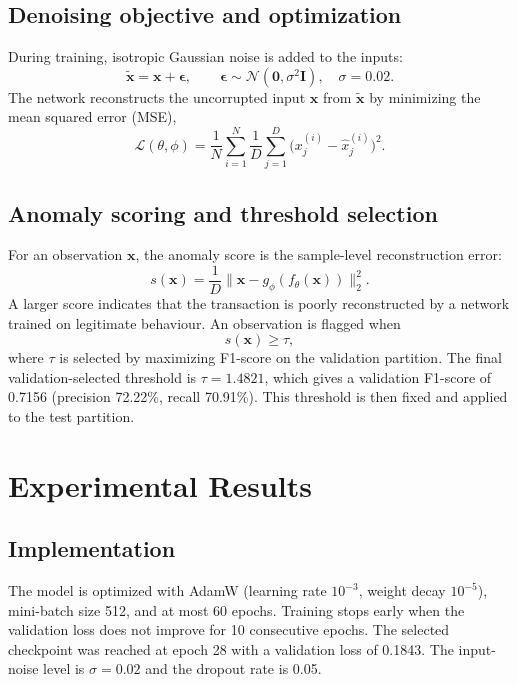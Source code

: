 \documentclass[conference]{IEEEtran}
\begin{document}
\subsection{Denoising objective and optimization}
During training, isotropic Gaussian noise is added to the inputs:
\begin{equation}
\tilde{\mathbf{x}}=\mathbf{x}+\boldsymbol{\epsilon},\qquad \boldsymbol{\epsilon}\sim\mathcal{N}(\mathbf{0},\sigma^{2}\mathbf{I}),\quad \sigma=0.02.
\end{equation}
The network reconstructs the uncorrupted input $\mathbf{x}$ from $\tilde{\mathbf{x}}$ by minimizing the mean squared error (MSE),
\begin{equation}
\mathcal{L}(\theta,\phi)=\frac{1}{N}\sum_{i=1}^{N}\frac{1}{D}\sum_{j=1}^{D}\bigl(x_j^{(i)}-\hat{x}_j^{(i)}\bigr)^{2}.
\label{eq:loss}
\end{equation}

\subsection{Anomaly scoring and threshold selection}
For an observation $\mathbf{x}$, the anomaly score is the sample-level reconstruction error:
\begin{equation}
s(\mathbf{x})=\frac{1}{D}\bigl\lVert\mathbf{x}-g_\phi(f_\theta(\mathbf{x}))\bigr\rVert_2^{2}.
\label{eq:score}
\end{equation}
A larger score indicates that the transaction is poorly reconstructed by a network trained on legitimate behaviour. An observation is flagged when
\begin{equation}
s(\mathbf{x})\geq\tau,
\end{equation}
where $\tau$ is selected by maximizing F1-score on the validation partition. The final validation-selected threshold is $\tau=1.4821$, which gives a validation F1-score of 0.7156 (precision 72.22\%, recall 70.91\%). This threshold is then fixed and applied to the test partition.

\section{Experimental Results}
\subsection{Implementation}
The model is optimized with AdamW (learning rate $10^{-3}$, weight decay $10^{-5}$), mini-batch size 512, and at most 60 epochs. Training stops early when the validation loss does not improve for 10 consecutive epochs. The selected checkpoint was reached at epoch 28 with a validation loss of 0.1843. The input-noise level is $\sigma=0.02$ and the dropout rate is 0.05.
\end{document}
